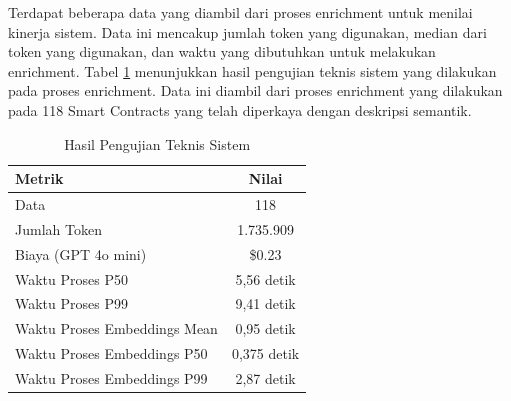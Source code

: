 Terdapat beberapa data yang diambil dari proses enrichment untuk menilai kinerja sistem. Data ini mencakup jumlah token yang digunakan, median dari token yang digunakan, dan waktu yang dibutuhkan untuk melakukan enrichment. Tabel \ref{table:hasil-pengujian-teknis-sistem} menunjukkan hasil pengujian teknis sistem yang dilakukan pada proses enrichment. Data ini diambil dari proses enrichment yang dilakukan pada 118 Smart Contracts yang telah diperkaya dengan deskripsi semantik.

\begin{table}[ht]
	\centering
	\caption{Hasil Pengujian Teknis Sistem}
	\label{table:hasil-pengujian-teknis-sistem}
	\begin{tabular}{|l|c|}
		\hline
		\textbf{Metrik} & \textbf{Nilai} \\ \hline
		Data       	                 & 118         \\ \hline
		Jumlah Token                 & 1.735.909   \\ \hline
		Biaya (GPT 4o mini)          & \$0.23      \\ \hline
		Waktu Proses P50             & 5,56 detik  \\ \hline
		Waktu Proses P99             & 9,41 detik  \\ \hline
		Waktu Proses Embeddings Mean & 0,95 detik \\ \hline
		Waktu Proses Embeddings P50  & 0,375 detik \\ \hline
		Waktu Proses Embeddings P99  & 2,87 detik  \\ \hline
	\end{tabular}
\end{table}

